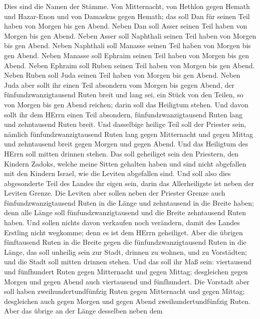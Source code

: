  Dies sind die Namen der Stämme. Von Mitternacht, von
Hethlon gegen Hemath und Hazar-Enon und von Damaskus gegen Hemath; das
soll Dan für seinen Teil haben von Morgen bis gen Abend. 
Neben Dan soll Asser seinen Teil haben von Morgen bis gen Abend.
 Neben Asser soll Naphthali seinen Teil haben von Morgen bis
gen Abend.  Neben Naphthali soll Manasse seinen Teil haben
von Morgen bis gen Abend.  Neben Manasse soll Ephraim seinen
Teil haben von Morgen bis gen Abend.  Neben Ephraim soll
Ruben seinen Teil haben von Morgen bis gen Abend.  Neben
Ruben soll Juda seinen Teil haben von Morgen bis gen Abend. 
Neben Juda aber sollt ihr einen Teil absondern vom Morgen bis gegen
Abend, der fünfundzwanzigtausend Ruten breit und lang sei, ein Stück von
den Teilen, so von Morgen bis gen Abend reichen; darin soll das
Heiligtum stehen.  Und davon sollt ihr dem HErrn einen Teil
absondern, fünfundzwanzigtausend Ruten lang und zehntausend Ruten breit.
 Und dasselbige heilige Teil soll der Priester sein,
nämlich fünfundzwanzigtausend Ruten lang gegen Mitternacht und gegen
Mittag und zehntausend breit gegen Morgen und gegen Abend. Und das
Heiligtum des HErrn soll mitten drinnen stehen.  Das soll
geheiliget sein den Priestern, den Kindern Zadoks, welche meine Sitten
gehalten haben und sind nicht abgefallen mit den Kindern Israel, wie die
Leviten abgefallen sind.  Und soll also dies abgesonderte
Teil des Landes ihr eigen sein, darin das Allerheiligste ist neben der
Leviten Grenze.  Die Leviten aber sollen neben der Priester
Grenze auch fünfundzwanzigtausend Ruten in die Länge und zehntausend in
die Breite haben; denn alle Länge soll fünfundzwanzigtausend und die
Breite zehntausend Ruten haben.  Und sollen nichts davon
verkaufen noch verändern, damit des Landes Erstling nicht wegkomme; denn
es ist dem HErrn geheiliget.  Aber die übrigen fünftausend
Ruten in die Breite gegen die fünfundzwanzigtausend Ruten in die Länge,
das soll unheilig sein zur Stadt, drinnen zu wohnen, und zu Vorstädten;
und die Stadt soll mitten drinnen stehen.  Und das soll ihr
Maß sein: viertausend und fünfhundert Ruten gegen Mitternacht und gegen
Mittag; desgleichen gegen Morgen und gegen Abend auch viertausend und
fünfhundert.  Die Vorstadt aber soll haben
zweihundertundfünfzig Ruten gegen Mitternacht und gegen Mittag;
desgleichen auch gegen Morgen und gegen Abend zweihundertundfünfzig
Ruten.  Aber das übrige an der Länge desselben neben dem

